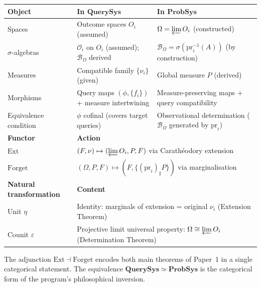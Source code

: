 \documentclass[11pt]{article}
\newcommand{\QSys}{\mathbf{QuerySys}}
\newcommand{\PSys}{\mathbf{ProbSys}}
\newcommand{\Ocal}{\mathcal{O}}
\newcommand{\Bcal}{\mathcal{B}}
\newcommand{\pr}{\mathrm{pr}}
\newcommand{\Ext}{\mathrm{Ext}}
\newcommand{\Forget}{\mathrm{Forget}}
\newcommand{\varlim}{\varprojlim}
\newcommand{\sharppush}{_\sharp}
\begin{document}
\begin{center}
\renewcommand{\arraystretch}{1.4}
\begin{tabular}{lll}
\hline
\textbf{Object} & \textbf{In $\QSys$} & \textbf{In $\PSys$} \\
\hline
Spaces & Outcome spaces $O_i$ (assumed) & $\Omega = \varlim O_i$ (constructed) \\
$\sigma$-algebras & $\Ocal_i$ on $O_i$ (assumed); $\Bcal_\Omega$ derived
  & $\Bcal_\Omega = \sigma(\pr_i^{-1}(A))$ (by construction) \\
Measures & Compatible family $\{\nu_i\}$ (given) & Global measure $P$ (derived) \\
Morphisms & Query maps $(\phi, \{f_i\})$ + measure intertwining & Measure-preserving maps + query compatibility \\
Equivalence condition & $\phi$ cofinal (covers target queries) & Observational determination ($\Bcal_\Omega$ generated by $\pr_i$) \\
\hline
\textbf{Functor} & \multicolumn{2}{l}{\textbf{Action}} \\
\hline
$\Ext$ & \multicolumn{2}{l}{$(F, \nu) \mapsto (\varlim O_i, P, F)$
  via Carathéodory extension} \\
$\Forget$ & \multicolumn{2}{l}{$(\Omega, P, F) \mapsto (F, \{(\pr_i)\sharppush P\})$
  via marginalisation} \\
\hline
\textbf{Natural transformation} & \multicolumn{2}{l}{\textbf{Content}} \\
\hline
Unit $\eta$ & \multicolumn{2}{l}{Identity: marginals of extension = original
  $\nu_i$ (Extension Theorem)} \\
Counit $\varepsilon$ & \multicolumn{2}{l}{Projective limit universal property:
  $\Omega \cong \varlim O_i$ (Determination Theorem)} \\
\hline
\end{tabular}
\end{center}

The adjunction $\Ext \dashv \Forget$ encodes both main theorems of Paper~1
in a single categorical statement.  The equivalence $\QSys \simeq \PSys$
is the categorical form of the program's philosophical inversion.
\end{document}
